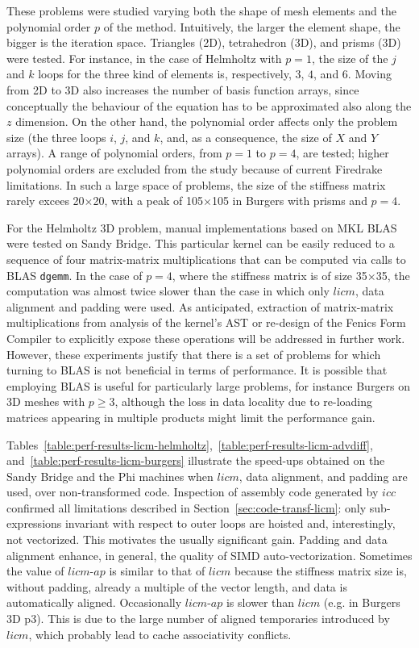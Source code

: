 \documentclass[conference]{IEEEtran}
\begin{document}
These problems were studied varying both the shape of mesh elements and the polynomial order $p$ of the method. Intuitively, the larger the element shape, the bigger is the iteration space. Triangles (2D), tetrahedron (3D), and prisms (3D) were tested. For instance, in the case of Helmholtz with $p=1$, the size of the $j$ and $k$ loops for the three kind of elements is, respectively, $3$, $4$, and $6$. Moving from 2D to 3D also increases the number of basis function arrays, since conceptually the behaviour of the equation has to be approximated also along the $z$ dimension. On the other hand, the polynomial order affects only the problem size (the three loops $i$, $j$, and $k$, and, as a consequence, the size of $X$ and $Y$ arrays). A range of polynomial orders, from $p=1$ to $p=4$, are tested; higher polynomial orders are excluded from the study because of current Firedrake limitations. In such a large space of problems, the size of the stiffness matrix rarely excees 20$\times$20, with a peak of 105$\times$105 in Burgers with prisms and $p=4$. 

For the Helmholtz 3D problem, manual implementations based on MKL BLAS were tested on Sandy Bridge. This particular kernel can be easily reduced to a sequence of four matrix-matrix multiplications that can be computed via calls to BLAS \texttt{dgemm}. In the case of $p=4$, where the stiffness matrix is of size 35$\times$35, the computation was almost twice slower than the case in which only $licm$, data alignment and padding were used. As anticipated, extraction of matrix-matrix multiplications from analysis of the kernel's AST or re-design of the Fenics Form Compiler to explicitly expose these operations will be addressed in further work. However, these experiments justify that there is a set of problems for which turning to BLAS is not beneficial in terms of performance. It is possible that employing BLAS is useful for particularly large problems, for instance Burgers on 3D meshes with $p \geq 3$, although the loss in data locality due to re-loading matrices appearing in multiple products might limit the performance gain. 

Tables~\ref{table:perf-results-licm-helmholtz},~\ref{table:perf-results-licm-advdiff}, and~\ref{table:perf-results-licm-burgers} illustrate the speed-ups obtained on the Sandy Bridge and the Phi machines when $licm$, data alignment, and padding are used, over non-transformed code. Inspection of assembly code generated by $icc$ confirmed all limitations described in Section~\ref{sec:code-transf-licm}: only sub-expressions invariant with respect to outer loops are hoisted and, interestingly, not vectorized. This motivates the usually significant gain. Padding and data alignment enhance, in general, the quality of SIMD auto-vectorization. Sometimes the value of $licm$-$ap$ is similar to that of $licm$ because the stiffness matrix size is, without padding, already a multiple of the vector length, and data is automatically aligned. Occasionally $licm$-$ap$ is slower than $licm$ (e.g. in Burgers 3D p3). This is due to the large number of aligned temporaries introduced by $licm$, which probably lead to cache associativity conflicts. 
\end{document}
